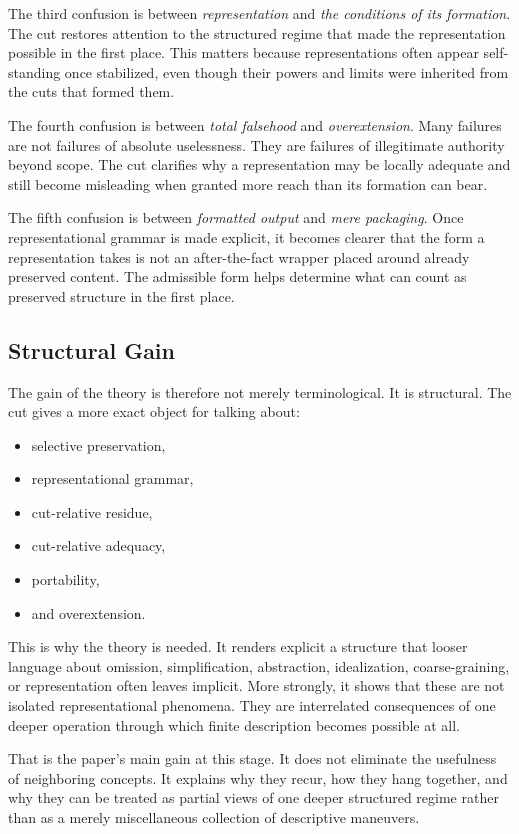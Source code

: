 \documentclass[11pt]{article}
\renewcommand{\emph}[1]{\textit{#1}}
\begin{document}
The third confusion is between \emph{representation} and \emph{the conditions of its formation}. The cut restores attention to the structured regime that made the representation possible in the first place. This matters because representations often appear self-standing once stabilized, even though their powers and limits were inherited from the cuts that formed them.

The fourth confusion is between \emph{total falsehood} and \emph{overextension}. Many failures are not failures of absolute uselessness. They are failures of illegitimate authority beyond scope. The cut clarifies why a representation may be locally adequate and still become misleading when granted more reach than its formation can bear.

The fifth confusion is between \emph{formatted output} and \emph{mere packaging}. Once representational grammar is made explicit, it becomes clearer that the form a representation takes is not an after-the-fact wrapper placed around already preserved content. The admissible form helps determine what can count as preserved structure in the first place.

\subsection{Structural Gain}

The gain of the theory is therefore not merely terminological. It is structural. The cut gives a more exact object for talking about:
\begin{itemize}
    \item selective preservation,
    \item representational grammar,
    \item cut-relative residue,
    \item cut-relative adequacy,
    \item portability,
    \item and overextension.
\end{itemize}

This is why the theory is needed. It renders explicit a structure that looser language about omission, simplification, abstraction, idealization, coarse-graining, or representation often leaves implicit. More strongly, it shows that these are not isolated representational phenomena. They are interrelated consequences of one deeper operation through which finite description becomes possible at all.

That is the paper's main gain at this stage. It does not eliminate the usefulness of neighboring concepts. It explains why they recur, how they hang together, and why they can be treated as partial views of one deeper structured regime rather than as a merely miscellaneous collection of descriptive maneuvers.
\end{document}
